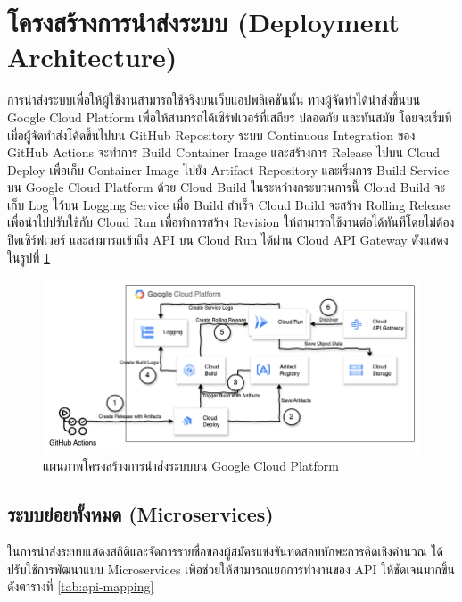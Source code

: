 \section{โครงสร้างการนำส่งระบบ (Deployment Architecture)}

การนำส่งระบบเพื่อให้ผู้ใช้งานสามารถใช้จริงบนเว็บแอปพลิเคชันนั้น ทางผู้จัดทำได้นำส่งขึ้นบน Google Cloud Platform เพื่อให้สามารถได้เซิร์ฟเวอร์ที่เสถียร ปลอดภัย และทันสมัย โดยจะเริ่มที่
เมื่อผู้จัดทำส่งโค้ดขึ้นไปบน GitHub Repository ระบบ Continuous Integration ของ GitHub Actions จะทำการ Build Container Image และสร้างการ Release ไปบน Cloud Deploy เพื่อเก็บ Container Image ไปยัง Artifact Repository และเริ่มการ Build Service บน Google Cloud Platform ด้วย Cloud Build ในระหว่างกระบวนการนี้ Cloud Build จะเก็บ Log ไว้บน Logging Service เมื่อ Build สำเร็จ Cloud Build จะสร้าง Rolling Release เพื่อนำไปปรับใช้กับ Cloud Run เพื่อทำการสร้าง Revision ให้สามารถใช้งานต่อได้ทันทีโดยไม่ต้องปิดเซิร์ฟเวอร์ และสามารถเข้าถึง API บน Cloud Run ได้ผ่าน Cloud API Gateway
ดังแสดงในรูปที่ \ref{fig:deployment-architecture}

\begin{figure}[H]
    \centering
    \includegraphics[width=120mm,scale=1.0]{diagrams/cloud.png}
    \caption{แผนภาพโครงสร้างการนำส่งระบบบน Google Cloud Platform}
    \label{fig:deployment-architecture}
\end{figure}

\subsection{ระบบย่อยทั้งหมด (Microservices)}

ในการนำส่งระบบแสดงสถิติและจัดการรายชื่อของผู้สมัครแข่งขันทดสอบทักษะการคิดเชิงคำนวณ ได้ปรับใช้การพัฒนาแบบ Microservices เพื่อช่วยให้สามารถแยกการทำงานของ API ให้ชัดเจนมากขึ้น ดังตารางที่ \ref{tab:api-mapping}


